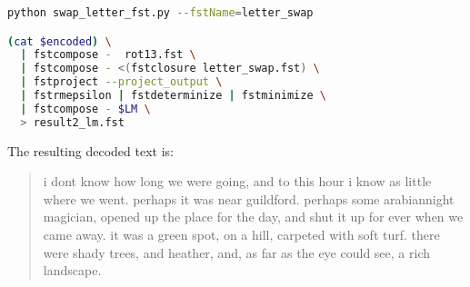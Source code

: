 \documentclass[a4paper,oneside,reqno]{amsart}
\begin{document}
\begin{enumerate}[label=\arabic*.]
\begin{enumerate}[label=(\alph*)]
\begin{lstlisting}[language=bash]
python swap_letter_fst.py --fstName=letter_swap

(cat $encoded) \
  | fstcompose -  rot13.fst \
  | fstcompose - <(fstclosure letter_swap.fst) \
  | fstproject --project_output \
  | fstrmepsilon | fstdeterminize | fstminimize \
  | fstcompose - $LM \
  > result2_lm.fst
    \end{lstlisting}
    The resulting decoded text is:
    \begin{quote}
      i dont know how long we were going, and to this hour i know as little where we
      went. perhaps it was near guildford. perhaps some arabiannight magician,
      opened up the place for the day, and shut it up for ever when we came
      away. it was a green spot, on a hill, carpeted with soft turf. there were
      shady trees, and heather, and, as far as the eye could see, a rich
      landscape.
    \end{quote}
  \end{enumerate}
\end{enumerate}

%
%


\end{document}
